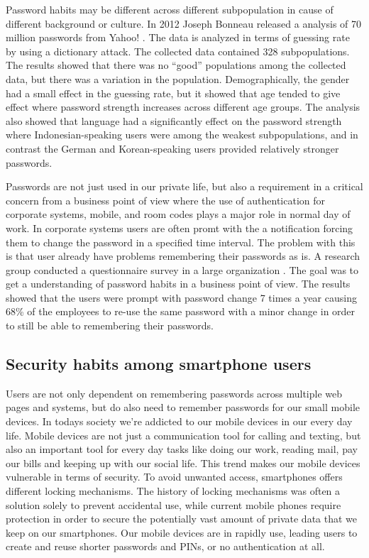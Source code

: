     Password habits may be different across different subpopulation in cause of different background or culture. In 2012 Joseph Bonneau released a analysis of 70 million passwords from Yahoo! \cite{Bonneau2}. The data is analyzed in terms of guessing rate by using a dictionary attack. The collected data contained 328 subpopulations. The results showed that there was no ``good'' populations among the collected data, but there was a variation in the population. Demographically, the gender had a small effect in the guessing rate, but it showed that age tended to give effect where password strength increases across different age groups. The analysis also showed that language had a significantly effect on the password strength where Indonesian-speaking users were among the weakest subpopulations, and in contrast the German and Korean-speaking users provided relatively stronger passwords. 

    Passwords are not just used in our private life, but also a requirement in a critical concern from a business point of view where the use of authentication for corporate systems, mobile, and room codes plays a major role in normal day of work. In corporate systems users are often promt with the a notification forcing them to change the password in a specified time interval. The problem with this is that user already have problems remembering their passwords as is. A research group conducted a questionnaire survey in a large organization \cite{habits2}. The goal was to get a understanding of password habits in a business point of view. The results showed that the users were prompt with password change 7 times a year causing 68\% of the employees to re-use the same password with a minor change in order to still be able to remembering their passwords.

    \subsection{Security habits among smartphone users}

    Users are not only dependent on remembering passwords across multiple web pages and systems, but do also need to remember passwords for our small mobile devices. In todays society we're addicted to our mobile devices in our every day life. Mobile devices are not just a communication tool for calling and texting, but also an important tool for every day tasks like doing our work, reading mail, pay our bills and keeping up with our social life. This trend makes our mobile devices vulnerable in terms of security. To avoid unwanted access, smartphones offers different locking mechanisms. The history of locking mechanisms was often a solution solely to prevent accidental use, while current mobile phones require protection in order to secure the potentially vast amount of private data that we keep on our smartphones. Our mobile devices are in rapidly use, leading users to create and reuse shorter passwords and PINs, or no authentication at all. 

